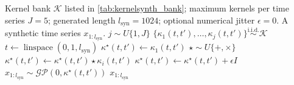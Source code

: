 \begin{algorithm}
\caption{KernelSynth: Synthetic Data Generation using Gaussian Processes}
\label{alg:kernelsynth}
\begin{algorithmic}[1]
\Require Kernel bank $\mathcal{K}$ listed in \autoref{tab:kernelsynth_bank}; maximum kernels per time series $J=5$; generated length $l_{\mathrm{syn}}=1024$; optional numerical jitter $\epsilon=0$.
\Ensure A synthetic time series $x_{1:l_{\mathrm{syn}}}$.
\State $j \sim U\{1,J\}$ 
\State $\{\kappa_1(t,t'),\ldots,\kappa_j(t,t')\} \overset{\mathrm{i.i.d.}}{\sim} \mathcal{K}$ 
\State $t \gets \operatorname{linspace}(0,1,l_{\mathrm{syn}})$
\State $\kappa^\star(t,t') \gets \kappa_1(t,t')$ 
    \State $\star \sim U\{+,\times\}$ 
    \State $\kappa^\star(t,t') \gets \kappa^\star(t,t') \star \kappa_i(t,t')$ 
\EndFor
{}
    \State $\kappa^\star(t,t') \gets \kappa^\star(t,t') + \epsilon I$
\EndIf
\State $x_{1:l_{\mathrm{syn}}} \sim \mathcal{GP}(0,\kappa^\star(t,t'))$ 
\State \Return $x_{1:l_{\mathrm{syn}}}$
\end{algorithmic}
\end{algorithm}